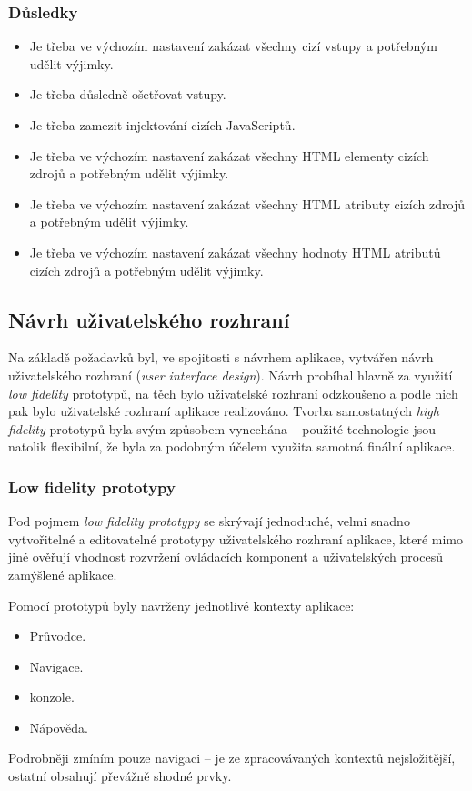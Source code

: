 \subsubsection{Důsledky}
\begin{itemize}
 \item Je třeba ve výchozím nastavení zakázat všechny cizí vstupy a potřebným udělit výjimky.
 \item Je třeba důsledně ošetřovat vstupy.
 \item Je třeba zamezit injektování cizích JavaScriptů.
 \item Je třeba ve výchozím nastavení zakázat všechny HTML elementy cizích zdrojů a potřebným udělit výjimky.
 \item Je třeba ve výchozím nastavení zakázat všechny HTML atributy cizích zdrojů a potřebným udělit výjimky.
 \item Je třeba ve výchozím nastavení zakázat všechny hodnoty HTML atributů cizích zdrojů a potřebným udělit výjimky.
\end{itemize}


\subsection{Návrh uživatelského rozhraní}
Na základě požadavků byl, ve spojitosti s návrhem aplikace, vytvářen návrh uživatelského rozhraní (\textit{user interface design}). Návrh probíhal hlavně za využití \textit{low fidelity} prototypů, na těch bylo uživatelské rozhraní odzkoušeno a podle nich pak bylo uživatelské rozhraní aplikace realizováno. Tvorba samostatných \textit{high fidelity} prototypů byla svým způsobem vynechána -- použité technologie jsou natolik flexibilní, že byla za podobným účelem využita samotná finální aplikace.

\subsubsection{Low fidelity prototypy}
Pod pojmem \textit{low fidelity prototypy} se skrývají jednoduché, velmi snadno vytvořitelné a editovatelné prototypy uživatelského rozhraní aplikace, které mimo jiné ověřují vhodnost rozvržení ovládacích komponent a uživatelských procesů zamýšlené aplikace.

Pomocí prototypů byly navrženy jednotlivé kontexty aplikace:
\begin{itemize}
 \item Průvodce.
 \item Navigace.
 \item {} konzole.
 \item Nápověda.
\end{itemize}
Podrobněji zmíním pouze navigaci -- je ze zpracovávaných kontextů nejsložitější, ostatní obsahují převážně shodné prvky.

